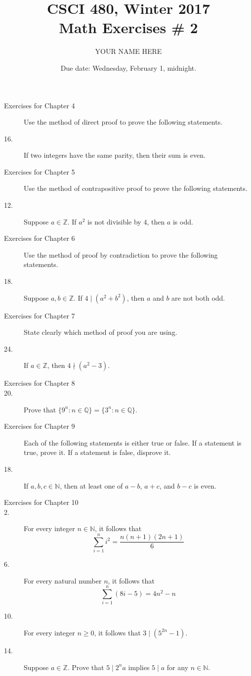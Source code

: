 \documentclass{article}
\title{CSCI 480, Winter 2017\\Math Exercises \# 2}
\author{YOUR NAME HERE}
\date{Due date:  Wednesday, February 1, midnight.}
\begin{document}
\maketitle



\begin{description}
\item[Exercises for Chapter 4]
Use the method of direct proof to prove the following statements.
\item[16.] If two integers have the same parity, then their sum is even.

\item[Exercises for Chapter 5]
Use the method of contrapositive proof to prove the following statements.
\item[12.]  Suppose $a\in\mathbb{Z}$.  If $a^2$ is not divisible by 4,
  then $a$ is odd.


\item[Exercises for Chapter 6]
Use the method of proof by contradiction to prove the following statements.
\item[18.] Suppose $a,b\in\mathbb{Z}$.  If $4\mid (a^2 + b^2)$, then
  $a$ and $b$ are not both odd.

\item[Exercises for Chapter 7]
  State clearly which method of proof you are using.
\item[24.]  If $a\in\mathbb{Z}$, then $4\nmid (a^2-3)$.
  

\item[Exercises for Chapter 8]
\item[20.] Prove that $\{9^n:n\in\mathbb{Q}\}= \{3^n:n\in\mathbb{Q}\}$.  

\item[Exercises for Chapter 9]
  Each of the following statements is either true or false.
  If a statement is true, prove it.
  If a statement is false, disprove it.
\item[18.] If $a,b,c\in\mathbb{N}$, then at least one of $a-b$,
  $a+c$, and $b-c$ is even.

  

\item[Exercises for Chapter 10]
  
\item[2.] For every integer $n\in\mathbb{N}$, it follows that
  \[
  \sum_{i=1}^n i^2 = \frac{n(n+1)(2n+1)}{6}
  \]

\item[6.] For every natural number $n$, it follows that
  \[
  \sum_{i=1}^{n}(8i-5) = 4n^2 - n
  \]

\item[10.] For every integer $n\geq 0$, it follows that $3\mid (5^{2n} - 1)$.


\item[14.]
 Suppose $a\in\mathbb{Z}$.  Prove that $5\mid 2^na$ implies
  $5\mid a$ for any $n\in\mathbb{N}$.

\end{description}
\end{document}
